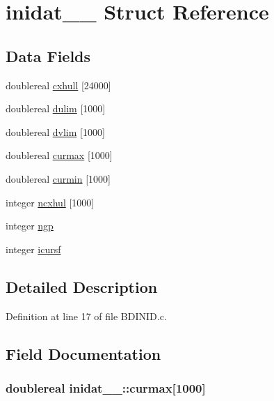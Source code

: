 \hypertarget{structinidat__1__}{}\section{inidat\+\_\+\_\+ Struct Reference}
\label{structinidat__1__}
\subsection*{Data Fields}
\begin{DoxyCompactItemize}
\item 
doublereal \hyperlink{structinidat__1___a1eb40f7014535dab631e6178c37462ef}{cxhull} \mbox{[}24000\mbox{]}
\item 
doublereal \hyperlink{structinidat__1___affa3d4c34e689e56c0daa678c049e81c}{dulim} \mbox{[}1000\mbox{]}
\item 
doublereal \hyperlink{structinidat__1___a435a6fd17a4e842c378c86a2545faafc}{dvlim} \mbox{[}1000\mbox{]}
\item 
doublereal \hyperlink{structinidat__1___a4a3b349f63af5b4e283b5c5ed0656959}{curmax} \mbox{[}1000\mbox{]}
\item 
doublereal \hyperlink{structinidat__1___a8768904a6974855f057cbcbd7b9df0a1}{curmin} \mbox{[}1000\mbox{]}
\item 
integer \hyperlink{structinidat__1___ad027e4a04263ae962d0762b7af80c2fc}{ncxhul} \mbox{[}1000\mbox{]}
\item 
integer \hyperlink{structinidat__1___ab8eea4cdb6cc88d601cf24fa61b90d59}{ngp}
\item 
integer \hyperlink{structinidat__1___a652c8cd30f41629d510eccbf466ed058}{icursf}
\end{DoxyCompactItemize}


\subsection{Detailed Description}


Definition at line 17 of file B\+D\+I\+N\+I\+D.\+c.



\subsection{Field Documentation}
\subsubsection[{\texorpdfstring{curmax}{curmax}}]{\setlength{\rightskip}{0pt plus 5cm}doublereal inidat\+\_\+\_\+\+::curmax\mbox{[}1000\mbox{]}}\hypertarget{structinidat__1___a4a3b349f63af5b4e283b5c5ed0656959}{}\label{structinidat__1___a4a3b349f63af5b4e283b5c5ed0656959}


